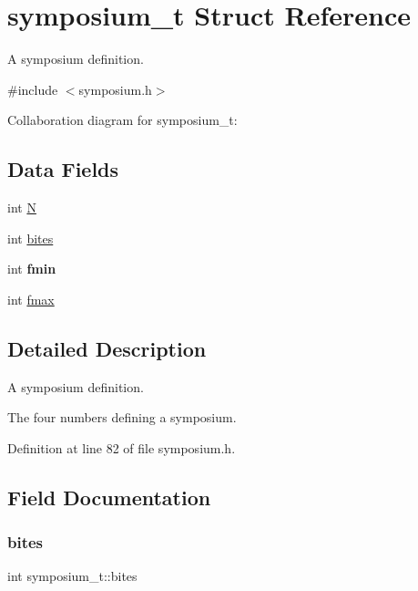 \hypertarget{structsymposium__t}{}\section{symposium\+\_\+t Struct Reference}
\label{structsymposium__t}


A symposium definition.  




{\ttfamily \#include $<$symposium.\+h$>$}



Collaboration diagram for symposium\+\_\+t\+:
\subsection*{Data Fields}
\begin{DoxyCompactItemize}
\item 
int \hyperlink{structsymposium__t_a4e366c10036b2d89ebc2dbcdefba8999}{N}
\item 
int \hyperlink{structsymposium__t_a9ee1b978200b8a4b7c30b170c1f20643}{bites}
\item 
\mbox{\label{structsymposium__t_ab7af5af3a92d6c03bf916571a09d6aed}} 
int {\bfseries fmin}
\item 
int \hyperlink{structsymposium__t_a038b49a350225fed31d5c148a9147ec6}{fmax}
\end{DoxyCompactItemize}


\subsection{Detailed Description}
A symposium definition. 

The four numbers defining a symposium. 

Definition at line 82 of file symposium.\+h.



\subsection{Field Documentation}
\mbox{\label{structsymposium__t_a9ee1b978200b8a4b7c30b170c1f20643}} 
\subsubsection{\texorpdfstring{bites}{bites}}
{\footnotesize\ttfamily int symposium\+\_\+t\+::bites}

